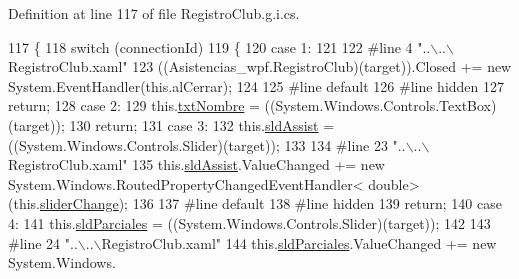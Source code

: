 Definition at line 117 of file Registro\-Club.\-g.\-i.\-cs.


\begin{DoxyCode}
117                                                                                                 \{
118             \textcolor{keywordflow}{switch} (connectionId)
119             \{
120             \textcolor{keywordflow}{case} 1:
121             
122 \textcolor{preprocessor}{            #line 4 "..\(\backslash\)..\(\backslash\)RegistroClub.xaml"}
123 \textcolor{preprocessor}{}            ((Asistencias\_wpf.RegistroClub)(target)).Closed += \textcolor{keyword}{new} System.EventHandler(\textcolor{keyword}{this}.alCerrar);
124             
125 \textcolor{preprocessor}{            #line default}
126 \textcolor{preprocessor}{}\textcolor{preprocessor}{            #line hidden}
127 \textcolor{preprocessor}{}            \textcolor{keywordflow}{return};
128             \textcolor{keywordflow}{case} 2:
129             this.\hyperlink{class_asistencias__wpf_1_1_registro_club_a9acb8f17b99701c92a5afec34b18ea0b}{txtNombre} = ((System.Windows.Controls.TextBox)(target));
130             \textcolor{keywordflow}{return};
131             \textcolor{keywordflow}{case} 3:
132             this.\hyperlink{class_asistencias__wpf_1_1_registro_club_a3488b5171d3eb821ec59219ca8d4fbf6}{sldAssist} = ((System.Windows.Controls.Slider)(target));
133             
134 \textcolor{preprocessor}{            #line 23 "..\(\backslash\)..\(\backslash\)RegistroClub.xaml"}
135 \textcolor{preprocessor}{}            this.\hyperlink{class_asistencias__wpf_1_1_registro_club_a3488b5171d3eb821ec59219ca8d4fbf6}{sldAssist}.ValueChanged += \textcolor{keyword}{new} System.Windows.RoutedPropertyChangedEventHandler<\textcolor{keywordtype}{
      double}>(this.\hyperlink{class_asistencias__wpf_1_1_registro_club_aa5c649a2b0870008205c3172101f2657}{sliderChange});
136             
137 \textcolor{preprocessor}{            #line default}
138 \textcolor{preprocessor}{}\textcolor{preprocessor}{            #line hidden}
139 \textcolor{preprocessor}{}            \textcolor{keywordflow}{return};
140             \textcolor{keywordflow}{case} 4:
141             this.\hyperlink{class_asistencias__wpf_1_1_registro_club_aff736140d07e1db41578a56e774b437c}{sldParciales} = ((System.Windows.Controls.Slider)(target));
142             
143 \textcolor{preprocessor}{            #line 24 "..\(\backslash\)..\(\backslash\)RegistroClub.xaml"}
144 \textcolor{preprocessor}{}            this.\hyperlink{class_asistencias__wpf_1_1_registro_club_aff736140d07e1db41578a56e774b437c}{sldParciales}.ValueChanged += \textcolor{keyword}{new} System.Windows.

\end{DoxyCode}
